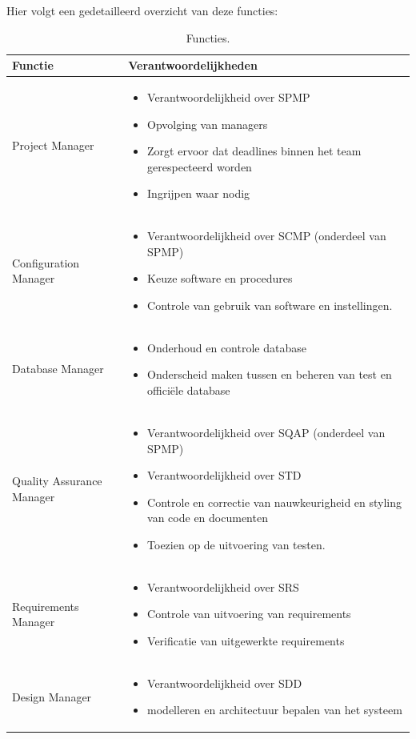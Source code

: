 Hier volgt een gedetailleerd overzicht van deze functies:
\begin{table} [H]
	\centering
	\caption{Functies.}
	\begin{tabular} {l | p{10cm}}
		Functie & Verantwoordelijkheden \\
		\hline
		Project Manager &  
		\begin{itemize}
		\item Verantwoordelijkheid over SPMP
		\item Opvolging van managers
		\item Zorgt ervoor dat deadlines binnen het team gerespecteerd worden
		\item Ingrijpen waar nodig
		\end{itemize}\\
		\hline
		Configuration Manager &
		\begin{itemize}
		\item Verantwoordelijkheid over SCMP (onderdeel van SPMP)
		\item Keuze software en procedures
		\item Controle van gebruik van software en instellingen.
		\end{itemize}\\
		\hline
		Database Manager &
		\begin{itemize}
		\item Onderhoud en controle database
		\item Onderscheid maken tussen en beheren van test en officiële database
		\end{itemize}\\
		\hline
		Quality Assurance Manager &
		\begin{itemize}
		\item Verantwoordelijkheid over SQAP (onderdeel van SPMP)
		\item Verantwoordelijkheid over STD
		\item Controle en correctie van nauwkeurigheid en styling van code en documenten
		\item Toezien op de uitvoering van testen.
		\end{itemize}\\
		\hline
		Requirements Manager &
		\begin{itemize}
		\item Verantwoordelijkheid over SRS
		\item Controle van uitvoering van requirements
		\item Verificatie van uitgewerkte requirements
		\end{itemize}\\
		\hline
		Design Manager &
		\begin{itemize}
		\item Verantwoordelijkheid over SDD
		\item modelleren en architectuur bepalen van het systeem
		\end{itemize}
	\end{tabular}
	\label{tab:functies}
\end{table}
